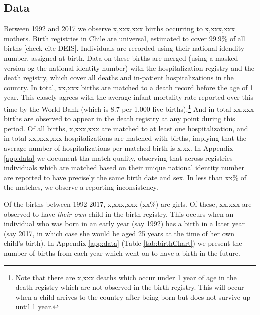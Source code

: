 \documentclass[11pt]{article}
\begin{document}
\begin{spacing}{1.5}
  \section{Data}
  Between 1992 and 2017 we observe x,xxx,xxx births occurring to x,xxx,xxx mothers.  Birth registries in Chile are universal, estimated to cover 99.9\% of all births [check cite DEIS].  Individuals are recorded using their national idendity number, assigned at birth. Data on these births are merged (using a masked version og the national identity number) with the hospitalization registry and the death registry, which cover all deaths and in-patient hospitalizations in the country.  In total, xx,xxx births are matched to a death record before the age of 1 year. This closely agrees with the average infant mortality rate reported over this time by the World Bank (which is 8.7 per 1,000 live births).\footnote{Note that there are x,xxx deaths which occur under 1 year of age in the death registry which are not observed in the birth registry. This will occur when a child arrives to the country after being born but does not survive up until 1 year.}  And in total xx,xxx births are observed to appear in the death registry at any point during this period.  Of all births, x,xxx,xxx are matched to at least one hospitalization, and in total xx,xxx,xxx hospitalizations are matched with births, implying that the average number of hospitalizations per matched birth is x.xx.  In Appendix \ref{app:data} we document tha match quality, observing that across registries individuals which are matched based on their unique national identity number are reported to have precisely the same birth date and sex.  In less than xx\% of the matches, we observe a reporting inconsistency.

  Of the births between 1992-2017, x,xxx,xxx (xx\%) are girls.  Of these, xx,xxx are observed to have \emph{their own} child in the birth registry.  This occurs when an individual who was born in an early year (say 1992) has a birth in a later year (say 2017, in which case she would be aged 25 years at the time of her own child's birth).  In Appendix \ref{app:data} (Table \ref{tab:birthChart}) we present the number of births from each year which went on to have a birth in the future.

  
  
  
  

\end{spacing}
\end{document}

